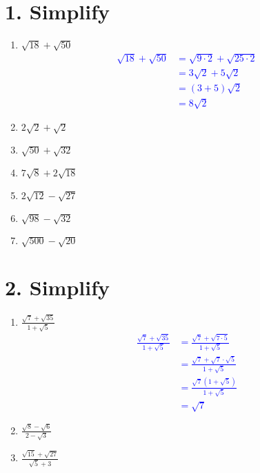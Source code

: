 \documentclass{hw}
\begin{document}
\section*{\normalsize 1. Simplify}
\begin{enumerate}[label=\alph*.]
    \item $\sqrt{18} + \sqrt{50}$
        \textcolor{blue}{
        \begin{align*}
            \sqrt{18} + \sqrt{50} &= \sqrt{9 \cdot 2} + \sqrt{25 \cdot 2} \\
                                  &= 3\sqrt{2} + 5\sqrt{2} \\
                                  &= (3 + 5)\sqrt{2} \\
                                  &= 8\sqrt{2}
        \end{align*}
        }
    \item $2\sqrt{2} + \sqrt{2}$
    \studentlargeworkspace
    \item $\sqrt{50} + \sqrt{32}$
    \studentxlargeworkspace
    \item $7\sqrt{8} + 2\sqrt{18}$
    \studentxlargeworkspace
    \item $2\sqrt{12} - \sqrt{27}$
    \studentxlargeworkspace
    \item $\sqrt{98} - \sqrt{32}$
    \studentxlargeworkspace
    \item $\sqrt{500} - \sqrt{20}$
    \studentxlargeworkspace
\end{enumerate}

\section*{\normalsize 2. Simplify}
\begin{enumerate}[label=\alph*.]
    \item $\frac{\sqrt{7} + \sqrt{35}}{1 + \sqrt{5}}$
        \textcolor{blue}{
        \begin{align*}
            \frac{\sqrt{7} + \sqrt{35}}{1 + \sqrt{5}} &= \frac{\sqrt{7} + \sqrt{7 \cdot 5}}{1 + \sqrt{5}} \\
                                                      &= \frac{\sqrt{7} + \sqrt{7} \cdot \sqrt{5}}{1 + \sqrt{5}} \\
                                                      &= \frac{\sqrt{7}(1 + \sqrt{5})}{1 + \sqrt{5}} \\
                                                      &= \sqrt{7}
        \end{align*}
        }
    \item $\frac{\sqrt{8} -\sqrt{6}}{2 - \sqrt{3}}$
    \studentxlargeworkspace
    \item $\frac{\sqrt{15} + \sqrt{27}}{\sqrt{5} + 3}$
    \studentxlargeworkspace

\end{enumerate}
\end{document}
